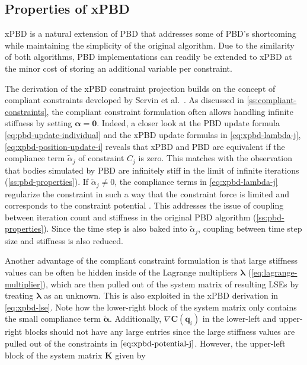 \subsection{Properties of xPBD}\label{ss:xpbd-properties}
xPBD is a natural extension of PBD that addresses some of PBD's shortcoming while maintaining the simplicity of the original algorithm. Due to
the similarity of both algorithms, PBD implementations can readily be extended to xPBD at the minor cost of storing an additional variable per 
constraint. 

The derivation of the xPBD constraint projection builds on the concept of compliant constraints developed by Servin et al.\ 
\cite{servin2006}. As discussed in \cref{ss:compliant-constraints}, the compliant constraint formulation often allows handling infinite stiffness by
setting $\bm{\alpha} = \bm{0}$. Indeed, a closer look at the PBD update formula \cref{eq:pbd-update-individual} and the xPBD update formulas
in \cref{eq:xpbd-lambda-j}, \cref{eq:xpbd-position-update-i} reveals that xPBD and PBD are equivalent if the compliance term $\tilde{\alpha}_j$ of 
constraint $C_j$ is zero. This matches with the observation that bodies simulated by PBD are infinitely stiff in the limit of infinite iterations 
(\cref{ss:pbd-properties}). If $\tilde{\alpha}_j \neq 0$, the compliance terms in \cref{eq:xpbd-lambda-j} regularize the constraint in such a 
way that the constraint force is limited and corresponds to the constraint potential \cite{macklin2016}. This addresses the issue of coupling
between iteration count and stiffness in the original PBD algorithm (\cref{ss:pbd-properties}). Since the time step is also baked into 
$\tilde{\alpha}_j$, coupling between time step size and stiffness is also reduced.

Another advantage of the compliant constraint 
formulation is that large stiffness values can be often be hidden inside of the Lagrange multipliers $\bm{\lambda}$ (\cref{eq:lagrange-multiplier}), 
which are then pulled out of the system matrix of resulting LSEs by treating $\bm{\lambda}$ as an unknown. This is also exploited in the xPBD
derivation in \cref{eq:xpbd-lse}. Note how the lower-right block of the system matrix only contains the 
small compliance term $\bm{\tilde{\alpha}}$. Additionally, $\nabla \bm{C}(\bm{q}_i)$ in the lower-left and upper-right blocks should not have 
any large entries since the large stiffness values are pulled out of the constraints in $\cref{eq:xpbd-potential-j}$. However, the upper-left 
block of the system matrix $\bm{K}$ given by 

